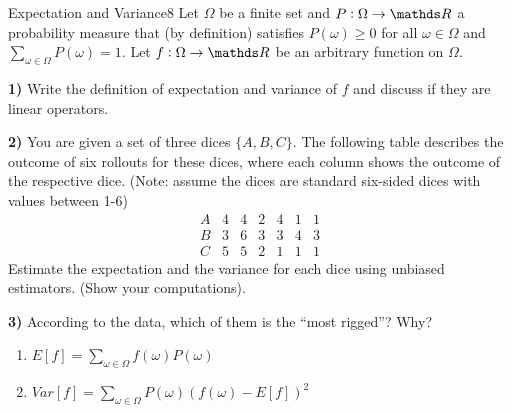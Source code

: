 \newif\ifvimbug
\vimbugfalse

\ifvimbug

\fi

 

\begin{questions}


\begin{question}{Expectation and Variance}{8}
Let $\Omega$ be a finite set and $P:\Omega\rightarrow\R$ a probability measure that (by definition) satisfies $P(\omega)\geq0$ for all $\omega\in\Omega$ and $\sum_{\omega\in\Omega}P(\omega)=1$. 
Let $f:\Omega\rightarrow\R$ be an arbitrary function on $\Omega$.

\textbf{1)} Write the definition of expectation and variance of $f$ and discuss if they are linear operators.

\textbf{2)} You are given a set of three dices $\{A,B,C\}$.
The following table describes the outcome of six rollouts for these dices, where each column shows the outcome of the respective dice. 
(Note: assume the dices are standard six-sided dices with values between 1-6)
\begin{equation*}
\begin{array}{r|cccccc}
    A & 4 & 4 & 2 & 4 & 1 & 1 \\
    \hline
    B & 3 & 6 & 3 & 3 & 4 & 3 \\
    \hline
    C & 5 & 5 & 2 & 1 & 1 & 1 
\end{array}
\end{equation*}
Estimate the expectation and the variance for each dice using unbiased estimators. (Show your computations).

\textbf{3)} According to the data, which of them is the ``most rigged''? Why?

\begin{answer}
\begin{enumerate}
		\item $ E[f]= \sum \limits_{\omega\in\Omega} f(\omega)P(\omega)$
		\item $Var[f]= \sum \limits_{\omega\in\Omega} P(\omega)(f(\omega)- E[f])^2$
\end{enumerate}
\end{answer}

\end{question}



\end{questions}
